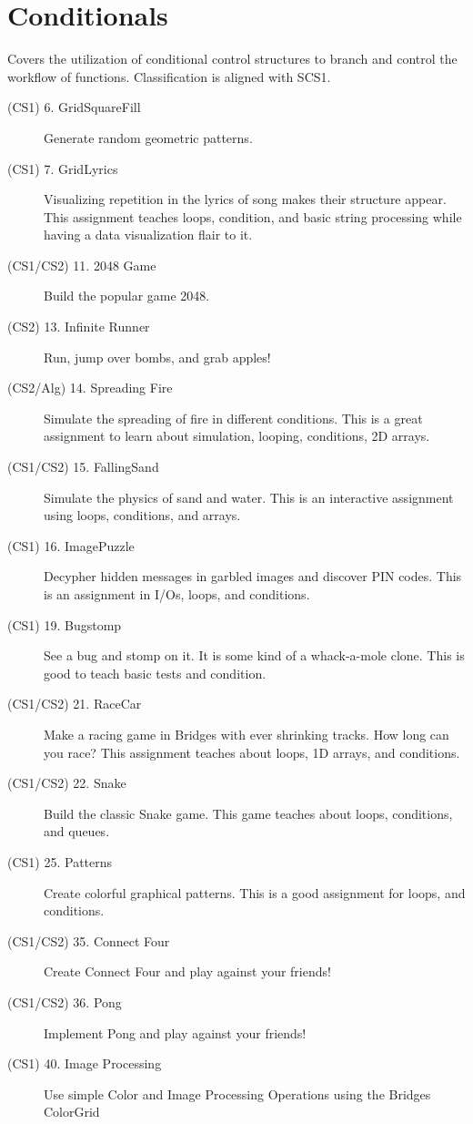 \documentclass[10pt, onecoulmn]{article}
\begin{document}
\section{Conditionals}
Covers the utilization of conditional control structures to branch and control the workflow of functions. Classification is aligned with SCS1.
\begin{description}
	\item[(CS1) 6. GridSquareFill] Generate random geometric patterns.
	\item[(CS1) 7. GridLyrics] Visualizing repetition in the lyrics of song makes their structure appear. This assignment teaches loops, condition, and basic string processing while having a data visualization flair to it.
	\item[(CS1/CS2) 11. 2048 Game] Build the popular game 2048.
	\item[(CS2) 13. Infinite Runner] Run, jump over bombs, and grab apples!
	\item[(CS2/Alg) 14. Spreading Fire] Simulate the spreading of fire in different conditions. This is a great assignment to learn about simulation, looping, conditions, 2D arrays.
	\item[(CS1/CS2) 15. FallingSand] Simulate the physics of sand and water. This is an interactive assignment using loops, conditions, and arrays.
	\item[(CS1) 16. ImagePuzzle] Decypher hidden messages in garbled images and discover PIN codes. This is an assignment in I/Os, loops, and conditions.
	\item[(CS1) 19. Bugstomp] See a bug and stomp on it. It is some kind of a whack-a-mole clone. This is good to teach basic tests and condition.
	\item[(CS1/CS2) 21. RaceCar] Make a racing game in Bridges with ever shrinking tracks. How long can you race? This assignment teaches about loops, 1D arrays, and conditions.
	\item[(CS1/CS2) 22. Snake] Build the classic Snake game. This game teaches about loops, conditions, and queues.
	\item[(CS1) 25. Patterns] Create colorful graphical patterns. This is a good assignment for loops, and conditions.
	\item[(CS1/CS2) 35. Connect Four] Create Connect Four and play against your friends!
	\item[(CS1/CS2) 36. Pong] Implement Pong and play against your friends!
	\item[(CS1) 40. Image Processing] Use simple Color and Image Processing Operations using the Bridges ColorGrid

\end{description}
\end{document}
